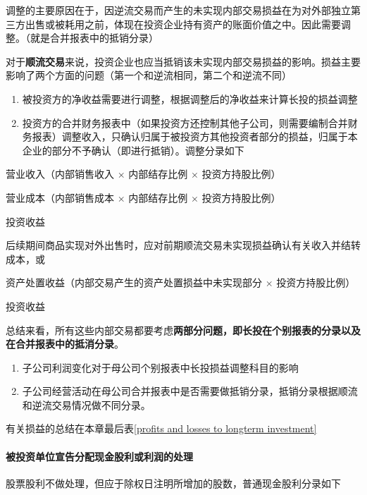 \documentclass[UTF8,12pt]{ctexart}
\newenvironment{Dr}{%
	\begin{list}{}%
		{
			\setlength{\leftmargin}{2em}
			\setlength{\labelwidth}{2em}
			\setlength{\labelsep}{0pt}
			\setlength{\itemindent}{0pt}
			\setlength{\listparindent}{0pt}
			\setlength{\parsep}{0pt}
			\setlength{\topsep}{0pt}
		}
		\item[\textbf{借：}]
	}{%
	\end{list}
}
\newenvironment{Cr}{%
	\begin{list}{}%
		{
			\setlength{\leftmargin}{2em}
			\setlength{\labelwidth}{2em}
			\setlength{\labelsep}{0pt}
			\setlength{\itemindent}{0pt}
			\setlength{\listparindent}{0pt}
			\setlength{\parsep}{0pt}
			\setlength{\topsep}{0pt}
		}
		\item[\textbf{贷：}]
	}{%
	\end{list}
}
\numberwithin{equation}{section} %
\numberwithin{figure}{section}
\numberwithin{table}{section}
\begin{document}
	调整的主要原因在于，因逆流交易而产生的未实现内部交易损益在为对外部独立第三方出售或被耗用之前，体现在投资企业持有资产的账面价值之中。因此需要调整。（就是合并报表中的抵销分录）
	
	对于\textbf{顺流交易}来说，投资企业也应当抵销该未实现内部交易损益的影响。损益主要影响了两个方面的问题（第一个和逆流相同，第二个和逆流不同）
	\begin{enumerate}
		\item 被投资方的净收益需要进行调整，根据调整后的净收益来计算长投的损益调整
		
		\item 投资方的合并财务报表中（如果投资方还控制其他子公司，则需要编制合并财务报表）调整收入，只确认归属于被投资方其他投资者部分的损益，归属于本企业的部分不予确认（即进行抵销）。调整分录如下
	\end{enumerate}
	
	\begin{Dr}
		营业收入（内部销售收入 $\times$ 内部结存比例 $\times$ 投资方持股比例）
	\end{Dr}
	\begin{Cr}
		营业成本（内部销售成本 $\times$ 内部结存比例 $\times$ 投资方持股比例）
		
		投资收益
	\end{Cr}
	
	后续期间商品实现对外出售时，应对前期顺流交易未实现损益确认有关收入并结转成本，或
	
	\begin{Dr}
		资产处置收益（内部交易产生的资产处置损益中未实现部分 $\times$ 投资方持股比例）
	\end{Dr}
	\begin{Cr}
		投资收益 
	\end{Cr}
	
	
	总结来看，所有这些内部交易都要考虑\textbf{两部分问题，即长投在个别报表的分录以及在合并报表中的抵消分录}。
	\begin{enumerate}
		\item 子公司利润变化对于母公司个别报表中长投损益调整科目的影响
		
		\item 子公司经营活动在母公司合并报表中是否需要做抵销分录，抵销分录根据顺流和逆流交易情况做不同分录。
	\end{enumerate}
	
	有关损益的总结在本章最后表\ref{profits and losses to longterm investment}
	
	
	
	
	\paragraph{被投资单位宣告分配现金股利或利润的处理}股票股利不做处理，但应于除权日注明所增加的股数，普通现金股利分录如下
	
\end{document}
